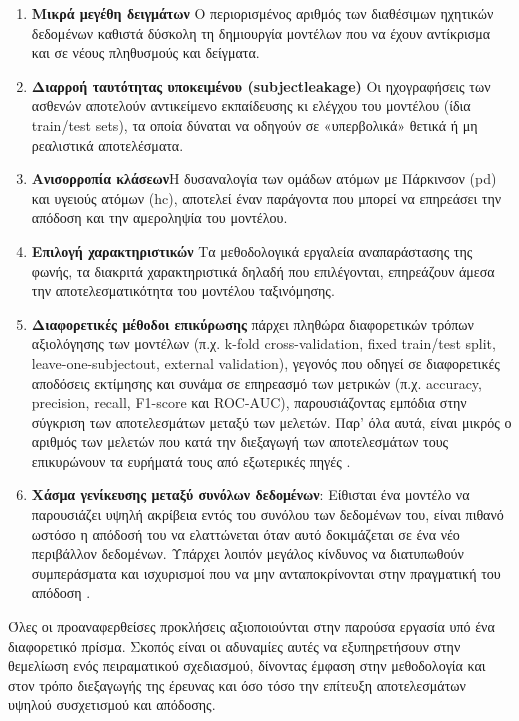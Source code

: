 \begin{enumerate}
    \item \textbf{Μικρά μεγέθη δειγμάτων} Ο περιορισμένος αριθμός των διαθέσιμων ηχητικών δεδομένων καθιστά δύσκολη τη δημιουργία μοντέλων που να έχουν αντίκρισμα και σε νέους πληθυσμούς και δείγματα.
    \item \textbf{Διαρροή ταυτότητας υποκειμένου (\gls{subjectleakage})} Οι ηχογραφήσεις των ασθενών αποτελούν αντικείμενο εκπαίδευσης κι ελέγχου του μοντέλου (ίδια train/test sets), τα οποία δύναται να οδηγούν σε «υπερβολικά» θετικά ή μη ρεαλιστικά αποτελέσματα.
    \item \textbf{Ανισορροπία κλάσεων}Η δυσαναλογία των ομάδων ατόμων με Πάρκινσον (\gls{pd}) και υγειούς ατόμων (\gls{hc}), αποτελεί έναν παράγοντα που μπορεί να επηρεάσει την απόδοση και την αμεροληψία του μοντέλου.
    \item \textbf{Επιλογή χαρακτηριστικών} Τα μεθοδολογικά εργαλεία αναπαράστασης της φωνής, τα διακριτά χαρακτηριστικά δηλαδή που επιλέγονται, επηρεάζουν άμεσα την αποτελεσματικότητα του μοντέλου ταξινόμησης.
    \item \textbf{Διαφορετικές μέθοδοι επικύρωσης} πάρχει πληθώρα διαφορετικών τρόπων αξιολόγησης των μοντέλων (π.χ. k-fold cross-validation, fixed train/test split, leave-one-subjectout, external validation), γεγονός που οδηγεί σε διαφορετικές αποδόσεις εκτίμησης και συνάμα σε επηρεασμό των μετρικών (π.χ. accuracy, precision, recall, F1-score και ROC-AUC), παρουσιάζοντας εμπόδια στην σύγκριση των αποτελεσμάτων μεταξύ των μελετών. Παρ’ όλα αυτά, είναι μικρός ο αριθμός των μελετών που κατά την διεξαγωγή των αποτελεσμάτων τους επικυρώνουν τα ευρήματά τους από εξωτερικές πηγές \citep{sedigh_malekroodi2025voice}.
    \item \textbf{Χάσμα γενίκευσης μεταξύ συνόλων δεδομένων}: Είθισται ένα μοντέλο να παρουσιάζει υψηλή ακρίβεια εντός του συνόλου των δεδομένων του, είναι πιθανό ωστόσο η απόδοσή του να ελαττώνεται όταν αυτό δοκιμάζεται σε ένα νέο περιβάλλον δεδομένων. Υπάρχει λοιπόν μεγάλος κίνδυνος να διατυπωθούν συμπεράσματα και ισχυρισμοί που να μην ανταποκρίνονται στην πραγματική του απόδοση \citep{sedigh_malekroodi2025voice}.
\end{enumerate}

Όλες οι προαναφερθείσες προκλήσεις αξιοποιούνται στην παρούσα εργασία υπό ένα διαφορετικό πρίσμα. Σκοπός είναι οι αδυναμίες αυτές να εξυπηρετήσουν στην θεμελίωση ενός πειραματικού σχεδιασμού, δίνοντας έμφαση στην μεθοδολογία και στον τρόπο διεξαγωγής της έρευνας και όσο τόσο την επίτευξη αποτελεσμάτων υψηλού συσχετισμού και απόδοσης.

